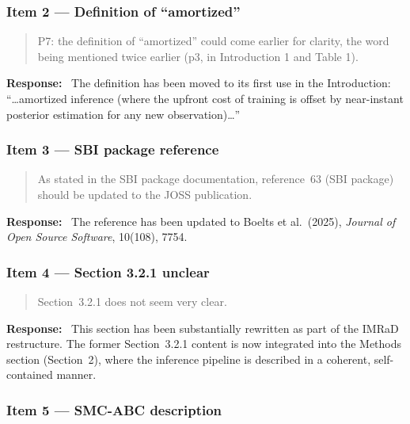 \documentclass[11pt,a4paper]{article}
\newenvironment{reviewercomment}{%
  \begin{quote}\itshape\color{reviewerblue}%
}{%
  \end{quote}%
}
\newcommand{\response}{\textbf{Response:}~}
\begin{document}
\subsubsection*{Item 2 --- Definition of ``amortized''}

\begin{reviewercomment}
P7: the definition of ``amortized'' could come earlier for clarity, the word being mentioned twice earlier (p3, in Introduction 1 and Table 1).
\end{reviewercomment}

\response
The definition has been moved to its first use in the Introduction: ``\ldots amortized inference (where the upfront cost of training is offset by near-instant posterior estimation for any new observation)\ldots''


\subsubsection*{Item 3 --- SBI package reference}

\begin{reviewercomment}
As stated in the SBI package documentation, reference~63 (SBI package) should be updated to the JOSS publication.
\end{reviewercomment}

\response
The reference has been updated to Boelts et al.\ (2025), \emph{Journal of Open Source Software}, 10(108), 7754.


\subsubsection*{Item 4 --- Section 3.2.1 unclear}

\begin{reviewercomment}
Section~3.2.1 does not seem very clear.
\end{reviewercomment}

\response
This section has been substantially rewritten as part of the IMRaD restructure. The former Section~3.2.1 content is now integrated into the Methods section (Section~2), where the inference pipeline is described in a coherent, self-contained manner.


\subsubsection*{Item 5 --- SMC-ABC description}
\end{document}
